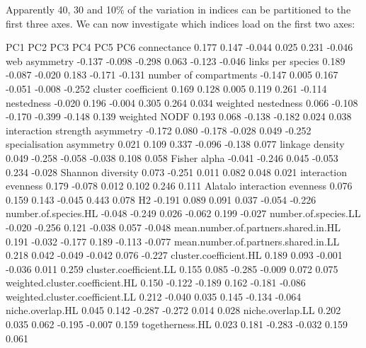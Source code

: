 \documentclass[a4paper, 11pt]{article}
\begin{document}
Apparently 40, 30 and 10\% of the variation in indices can be partitioned to the first three axes. We can now investigate which indices load on the first two axes:
\begin{Schunk}
\begin{Soutput}
                                        PC1    PC2    PC3    PC4    PC5    PC6
connectance                           0.177  0.147 -0.044  0.025  0.231 -0.046
web asymmetry                        -0.137 -0.098 -0.298  0.063 -0.123 -0.046
links per species                     0.189 -0.087 -0.020  0.183 -0.171 -0.131
number of compartments               -0.147  0.005  0.167 -0.051 -0.008 -0.252
cluster coefficient                   0.169  0.128  0.005  0.119  0.261 -0.114
nestedness                           -0.020  0.196 -0.004  0.305  0.264  0.034
weighted nestedness                   0.066 -0.108 -0.170 -0.399 -0.148  0.139
weighted NODF                         0.193  0.068 -0.138 -0.182  0.024  0.038
interaction strength asymmetry       -0.172  0.080 -0.178 -0.028  0.049 -0.252
specialisation asymmetry              0.021  0.109  0.337 -0.096 -0.138  0.077
linkage density                       0.049 -0.258 -0.058 -0.038  0.108  0.058
Fisher alpha                         -0.041 -0.246  0.045 -0.053  0.234 -0.028
Shannon diversity                     0.073 -0.251  0.011  0.082  0.048  0.021
interaction evenness                  0.179 -0.078  0.012  0.102  0.246  0.111
Alatalo interaction evenness          0.076  0.159  0.143 -0.045  0.443  0.078
H2                                   -0.191  0.089  0.091  0.037 -0.054 -0.226
number.of.species.HL                 -0.048 -0.249  0.026 -0.062  0.199 -0.027
number.of.species.LL                 -0.020 -0.256  0.121 -0.038  0.057 -0.048
mean.number.of.partners.shared.in.HL  0.191 -0.032 -0.177  0.189 -0.113 -0.077
mean.number.of.partners.shared.in.LL  0.218  0.042 -0.049 -0.042  0.076 -0.227
cluster.coefficient.HL                0.189  0.093 -0.001 -0.036  0.011  0.259
cluster.coefficient.LL                0.155  0.085 -0.285 -0.009  0.072  0.075
weighted.cluster.coefficient.HL       0.150 -0.122 -0.189  0.162 -0.181 -0.086
weighted.cluster.coefficient.LL       0.212 -0.040  0.035  0.145 -0.134 -0.064
niche.overlap.HL                      0.045  0.142 -0.287 -0.272  0.014  0.028
niche.overlap.LL                      0.202  0.035  0.062 -0.195 -0.007  0.159
togetherness.HL                       0.023  0.181 -0.283 -0.032  0.159  0.061

\end{Soutput}
\end{Schunk}
\end{document}
